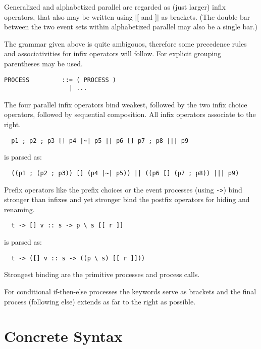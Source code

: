 \documentclass{article}
\begin{document}
Generalized and alphabetized parallel are regarded as (just larger) infix
operators, that also may be written using $|[$ and $]|$ as brackets. (The
double bar between the two event sets within alphabetized parallel may also be
a single bar.)

The grammar given above is quite ambigouos, therefore some precedence rules
and associativities for infix operators will follow. For explicit grouping
parentheses may be used.

\begin{verbatim}
PROCESS         ::= ( PROCESS )
                  | ...
\end{verbatim}

The four parallel infix operators bind weakest, followed by the two infix
choice operators, followed by sequential composition. All infix operators
associate to the right.

\begin{verbatim}
  p1 ; p2 ; p3 [] p4 |~| p5 || p6 [] p7 ; p8 ||| p9
\end{verbatim}

is parsed as:

\begin{verbatim}
  ((p1 ; (p2 ; p3)) [] (p4 |~| p5)) || ((p6 [] (p7 ; p8)) ||| p9)
\end{verbatim}

Prefix operators like the prefix choices or the event processes (using \verb|->|)
bind stronger than infixes and yet stronger bind the postfix operators for
hiding and renaming.

\begin{verbatim}
  t -> [] v :: s -> p \ s [[ r ]]
\end{verbatim}

is parsed as:

\begin{verbatim}
  t -> ([] v :: s -> ((p \ s) [[ r ]]))
\end{verbatim}

Strongest binding are the primitive processes and process calls.

For conditional if-then-else processes the keywords serve as brackets and the
final process (following else) extends as far to the right as possible.

\section{Concrete Syntax}


\end{document}
